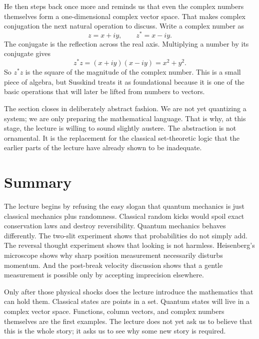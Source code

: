 He then steps back once more and reminds us that even the complex numbers themselves form a one-dimensional complex vector space. That makes complex conjugation the next natural operation to discuss. Write a complex number as
\begin{equation}
z=x+iy,
\qquad
z^\ast=x-iy.
\end{equation}
The conjugate is the reflection across the real axis. Multiplying a number by its conjugate gives
\begin{equation}
z^\ast z=(x+iy)(x-iy)=x^2+y^2.
\end{equation}
So \(z^\ast z\) is the square of the magnitude of the complex number. This is a small piece of algebra, but Susskind treats it as foundational because it is one of the basic operations that will later be lifted from numbers to vectors.

The section closes in deliberately abstract fashion. We are not yet quantizing a system; we are only preparing the mathematical language. That is why, at this stage, the lecture is willing to sound slightly austere. The abstraction is not ornamental. It is the replacement for the classical set-theoretic logic that the earlier parts of the lecture have already shown to be inadequate.

\section{Summary}

The lecture begins by refusing the easy slogan that quantum mechanics is just classical mechanics plus randomness. Classical random kicks would spoil exact conservation laws and destroy reversibility. Quantum mechanics behaves differently. The two-slit experiment shows that probabilities do not simply add. The reversal thought experiment shows that looking is not harmless. Heisenberg's microscope shows why sharp position measurement necessarily disturbs momentum. And the post-break velocity discussion shows that a gentle measurement is possible only by accepting imprecision elsewhere.

Only after those physical shocks does the lecture introduce the mathematics that can hold them. Classical states are points in a set. Quantum states will live in a complex vector space. Functions, column vectors, and complex numbers themselves are the first examples. The lecture does not yet ask us to believe that this is the whole story; it asks us to see why some new story is required.